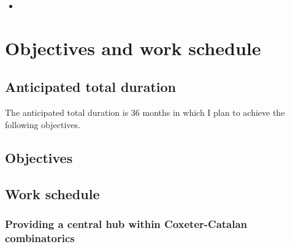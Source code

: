 \documentclass[a4paper,11pt]{article}
\begin{document}
\begin{itemize}
  \item {}
\end{itemize}

\section{Objectives and work schedule}

\subsection{Anticipated total duration}

The anticipated total duration is 36 months in which I plan to achieve the following objectives.

\subsection{Objectives}

\subsection{Work schedule}\label{sec:work schedule}
%
%

\subsubsection{Providing a central hub within Coxeter-Catalan combinatorics}
\label{sec:centralhub}
\end{document}
